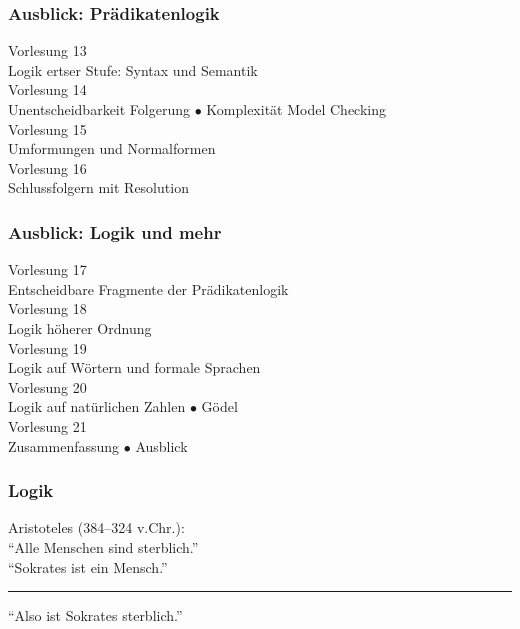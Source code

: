 \documentclass[onlymath]{beamer}
\begin{document}
\begin{frame}\frametitle{Ausblick: Prädikatenlogik}

\begin{center}
\alert{Vorlesung 13}\\
Logik ertser Stufe: Syntax und Semantik\\[1ex]
\alert{Vorlesung 14}\\
Unentscheidbarkeit Folgerung $\bullet$ Komplexität Model Checking \\[1ex]
\alert{Vorlesung 15}\\
Umformungen und Normalformen \\[1ex]
\alert{Vorlesung 16}\\
Schlussfolgern mit Resolution
\end{center}

\end{frame}

\begin{frame}\frametitle{Ausblick: Logik und mehr}

\begin{center}
\alert{Vorlesung 17}\\
Entscheidbare Fragmente der Prädikatenlogik\\[1ex]
\alert{Vorlesung 18}\\
Logik höherer Ordnung \\[1ex]
\alert{Vorlesung 19}\\
Logik auf Wörtern und formale Sprachen \\[1ex]
\alert{Vorlesung 20}\\
Logik auf natürlichen Zahlen $\bullet$ Gödel\\[1ex]
\alert{Vorlesung 21}\\
Zusammenfassung $\bullet$ Ausblick
\end{center}

\end{frame}


\begin{frame}\frametitle{Logik}

\begin{center}
Aristoteles (384--324 v.Chr.):\\[1cm]

"`Alle Menschen sind sterblich."'\\
"`Sokrates ist ein Mensch."'\\
\rule{7cm}{1pt}

"`Also ist Sokrates sterblich."'

\end{center}

\end{frame}
\end{document}
